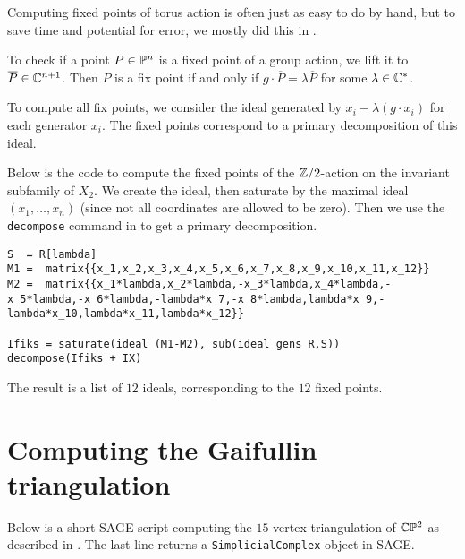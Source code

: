 Computing fixed points of torus action is often just as easy to do by hand, but to save time and potential for error, we mostly did this in \MM.

To check if a point $P \in \P^n$ is a fixed point of a group action, we lift it to $\overline{P} \in \C^{n+1}$. Then $P$ is a fix point if and only if $g \cdot \overline P = \lambda \overline P$ for some $\lambda \in \C^\ast$.

To compute all fix points, we consider the ideal generated by $x_i - \lambda (g \cdot x_i)$ for each generator $x_i$. The fixed points correspond to a primary decomposition of this ideal.

Below is the code to compute the fixed points of the $\Z/2$-action on the invariant subfamily of $X_2$. We create the ideal, then saturate by the maximal ideal $(x_1,\ldots,x_n)$ (since not all coordinates are allowed to be zero). Then we use the \texttt{decompose} command in \MM to get a primary decomposition.

\begin{lstlisting}[language=Macaulay2]
S  = R[lambda]
M1 =  matrix{{x_1,x_2,x_3,x_4,x_5,x_6,x_7,x_8,x_9,x_10,x_11,x_12}}
M2 =  matrix{{x_1*lambda,x_2*lambda,-x_3*lambda,x_4*lambda,-x_5*lambda,-x_6*lambda,-lambda*x_7,-x_8*lambda,lambda*x_9,-lambda*x_10,lambda*x_11,lambda*x_12}}

Ifiks = saturate(ideal (M1-M2), sub(ideal gens R,S))
decompose(Ifiks + IX)
\end{lstlisting}

The result is a list of $12$ ideals, corresponding to the $12$ fixed points.


\section{Computing the Gaifullin triangulation}
\label{sec:compute_gaifullin}

Below is a short SAGE script computing the $15$ vertex triangulation of $\C \P^2$ as described in \cite{cp2_15_chess}. The last line returns a \texttt{SimplicialComplex} object in SAGE.

